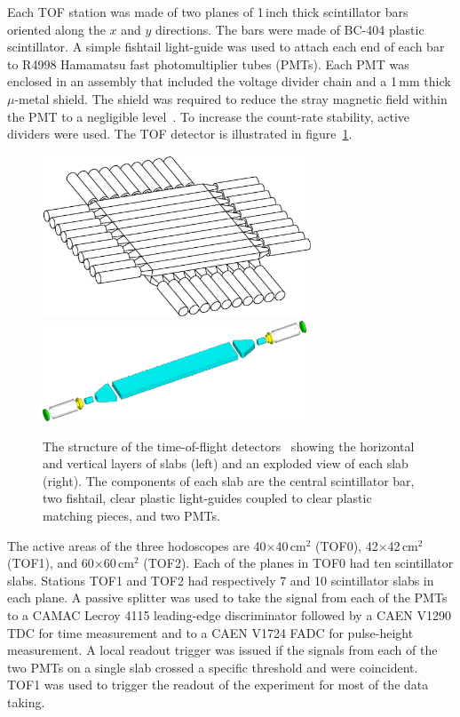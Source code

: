 Each TOF station was made of two planes of 1\,inch thick scintillator
bars oriented along the $x$ and $y$ directions. 
The bars were made of BC-404 plastic scintillator.
A simple fishtail light-guide was used to attach each end of each bar
to R4998 Hamamatsu fast photomultiplier tubes (PMTs).
Each PMT was enclosed in an assembly that included the voltage divider
chain and a 1\,mm thick $\mu$-metal shield.
The shield was required to reduce the stray magnetic field within the
PMT to a negligible level~\cite{2010NIMPA.615...14B}.
To increase the count-rate stability, active dividers were used.
The TOF detector is illustrated in figure~\ref{fig:tof:schematic}.
\begin{figure}[!htb]
  \begin{center}
    \includegraphics[width=8cm]{tof_diagram2}
    \includegraphics[height=3cm]{slab_design2}
  \end{center}
  \caption{
    The structure of the time-of-flight
    detectors~\cite{2010NIMPA.615...14B,NOTE145} showing the
    horizontal and vertical layers of slabs (left) and an exploded
    view of each slab (right). 
    The components of each slab are the central scintillator bar, two
    fishtail, clear plastic light-guides coupled to clear plastic
    matching pieces, and two PMTs.
  }
  \label{fig:tof:schematic}
\end{figure}

The active areas of the three hodoscopes are 40$\times$40\,cm$^2$
(TOF0), 42$\times$42\,cm$^2$ (TOF1), and 60$\times$60\,cm$^2$ (TOF2).
Each of the planes in TOF0 had ten scintillator slabs.
Stations TOF1 and TOF2 had respectively 7 and 10 scintillator slabs in each plane.
A passive splitter was used to take the signal from each of the PMTs
to a CAMAC Lecroy 4115 leading-edge discriminator followed by a CAEN
V1290 TDC for time measurement and to a CAEN V1724 FADC for
pulse-height measurement.
A local readout trigger was issued if the signals from each of the two
PMTs on a single slab crossed a specific threshold and were
coincident.
TOF1 was used to trigger the readout of the experiment for most of the
data taking. \\

